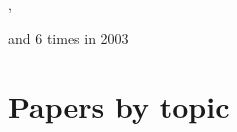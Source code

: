 \documentclass[12pt]{article}
\begin{document}
\begin{description}
{},\item
and 6 times in 2003 \citep{
2003A&A...411..321Y,%
2003A&A...407....7Y,%
2003ApJ...597L.141H,%
2003eclm.book..269B,%
2003astro.ph..3371B,%
2003PhRvE..68b6304D%
}
\end{description}

\section{Papers by topic}
\end{document}
